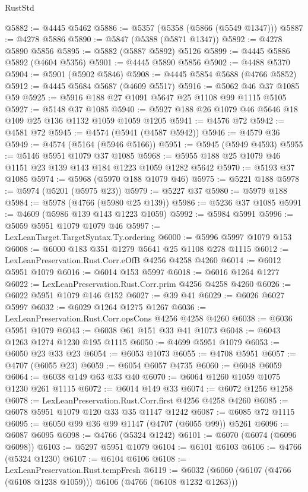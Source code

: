 \begin{lexlean}{RustStd}
\begin{coremodule}
{\begin{coremodule}
{{{{{{{{{{{{{{{{{{{{{{{{{{{{{{{{{{{@5882 := @4445 @5462
@5886 := @5357 (@5358 (@5866 (@5549 @1347)))
@5887 := @4278 @5886
@5890 := @5847 (@5388 (@5871 @1347))
@5892 := @4278 @5890 @5856
@5895 := @5882 (@5887 @5892) @5126
@5899 := @4445 @5886 @5892 (@4604 @5356)
@5901 := @4445 @5890 @5856
@5902 := @4488 @5370
@5904 := @5901 (@5902 @5846)
@5908 := @4445 @5854 @5688 (@4766 @5852)
@5912 := @4445 @5684 @5687 (@4609 @5517)
@5916 := @5062 @46 @37 @1085 @59
@5925 := @5916 @188 @27 @1091 @5647 @25 @1108 @99 @1115 @5105
@5927 := @5148 @37 @1085
@5940 := @5927 @188 @26 @1079 @46 @5646 @18 @109 @25 @136 @1132 @1059 @1059 @1205
@5941 := @4576 @72
@5942 := @4581 @72
@5945 := @4574 (@5941 (@4587 @5942))
@5946 := @4579 @36
@5949 := @4574 (@5164 (@5946 @5166))
@5951 := @5945 (@5949 @4593)
@5955 := @5146 @5951 @1079 @37 @1085
@5968 := @5955 @188 @25 @1079 @46 @1151 @23 @139 @143 @184 @1223 @1059 @1282 @5642
@5970 := @5193 @37 @1085
@5974 := @5968 (@5970 @188 @1079 @46)
@5975 := @5221 @188
@5978 := @5974 (@5201 (@5975 @23))
@5979 := @5227 @37
@5980 := @5979 @188
@5984 := @5978 (@4766 (@5980 @25 @139))
@5986 := @5236 @37 @1085
@5991 := @4609 (@5986 @139 @143 @1223 @1059)
@5992 := @5984 @5991
@5996 := @5059 @5951 @1079 @1079 @46
@5997 := LexLeanTarget.TargetSyntax.Ty.ordering
@6000 := @5996 @5997 @1079 @153
@6008 := @6000 @183 @351 @1279 @5641 @25 @1108 @278 @1115
@6012 := LexLeanPreservation.Rust.Corr.eOfB @4256 @4258 @4260
@6014 := @6012 @5951 @1079
@6016 := @6014 @153 @5997
@6018 := @6016 @1264 @1277
@6022 := LexLeanPreservation.Rust.Corr.prim @4256 @4258 @4260
@6026 := @6022 @5951 @1079 @146 @152
@6027 := @39 @41
@6029 := @6026 @6027 @5997
@6032 := @6029 @1264 @1275 @1267
@6036 := LexLeanPreservation.Rust.Corr.opsCons @4256 @4258 @4260
@6038 := @6036 @5951 @1079
@6043 := @6038 @61 @151 @33 @41 @1073
@6048 := @6043 @1263 @1274 @1230 @195 @1115
@6050 := @4699 @5951 @1079
@6053 := @6050 @23 @33 @23
@6054 := @6053 @1073
@6055 := @4708 @5951
@6057 := @4707 (@6055 @23)
@6059 := @6054 @6057 @4735
@6060 := @6048 @6059
@6064 := @6038 @149 @63 @33 @40
@6070 := @6064 @1260 @1059 @1075 @1230 @261 @1115
@6072 := @6014 @149 @33
@6074 := @6072 @1256 @1258
@6078 := LexLeanPreservation.Rust.Corr.first @4256 @4258 @4260
@6085 := @6078 @5951 @1079 @120 @33 @35 @1147 @1242
@6087 := @6085 @72 @1115
@6095 := @6050 @99 @36 @99 @1147 (@4707 (@6055 @99)) @5261
@6096 := @6087 @6095
@6098 := @4766 (@5324 @1242)
@6101 := @6070 (@6074 (@6096 @6098))
@6103 := @5297 @5951 @1079
@6104 := @6101 @6103
@6106 := @4766 (@5324 @1230)
@6107 := @6104 @6106
@6108 := LexLeanPreservation.Rust.tempFresh
@6119 := @6032 (@6060 (@6107 (@4766 (@6108 @1238 @1059))) @6106 (@4766 (@6108 @1232 @1263)))
}}}}}}}}}}}}}}}}}}}}}}}}}}}}}}}}}}}
\end{coremodule}}
\end{coremodule}
\end{lexlean}
